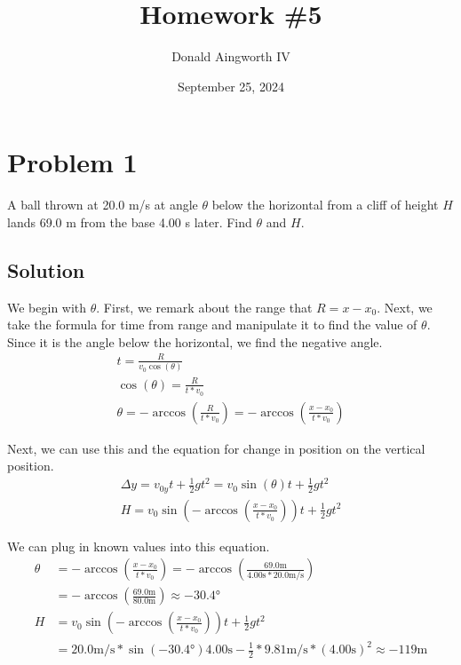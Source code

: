 \documentclass[12pt]{article}
\title{Homework \#5}
\author{Donald Aingworth IV}
\date{September 25, 2024}
\begin{document}

\maketitle

\section*{Problem 1}
A ball thrown at 20.0 m/s at angle $\theta$ below the horizontal from a cliff of height $H$ lands 69.0 m from the base 4.00 s later. Find $\theta$ and $H$.

\subsection*{Solution}
We begin with $\theta$. First, we remark about the range that $R = x - x_0$. Next, we take the formula for time from range and manipulate it to find the value of $\theta$. Since it is the angle below the horizontal, we find the negative angle.
\begin{eqnarray}
    t = \frac{R}{v_0 \cos(\theta)}\\
    \cos(\theta) = \frac{R}{t*v_0}\\
    \theta = -\arccos\left(\frac{R}{t*v_0}\right) = -\arccos\left(\frac{x - x_0}{t*v_0}\right)
\end{eqnarray}

Next, we can use this and the equation for change in position on the vertical position.
\begin{eqnarray}
    \Delta y = v_{0y}t + \frac{1}{2} gt^2 = v_0 \sin\left(\theta \right) t + \frac{1}{2} gt^2 \\
    H = v_0 \sin\left( -\arccos\left(\frac{x - x_0}{t*v_0} \right) \right) t + \frac{1}{2} gt^2
\end{eqnarray}

We can plug in known values into this equation.
\begin{align}
    \theta &= -\arccos\left(\frac{x - x_0}{t*v_0}\right) 
            = -\arccos\left(\frac{69.0\unit{\meter}}{4.00\unit{\second} * 20.0\unit{\meter/\second}}\right) \\
           &= -\arccos\left(\frac{69.0\unit{\meter}}{80.0\unit{\meter}}\right) 
            \approx \boxed{-30.4\unit{\degree}}\\
    H &= v_0 \sin\left( -\arccos\left(\frac{x - x_0}{t*v_0} \right) \right) t + \frac{1}{2} gt^2\\
      &= 20.0\unit{\meter/\second} * \sin\left( -30.4\unit{\degree} \right) 4.00\unit{\second} - \frac{1}{2} * 9.81\unit{\meter/\second} * (4.00\unit{\second})^2 \approx -119 \unit{\meter}
\end{align}
\end{document}
